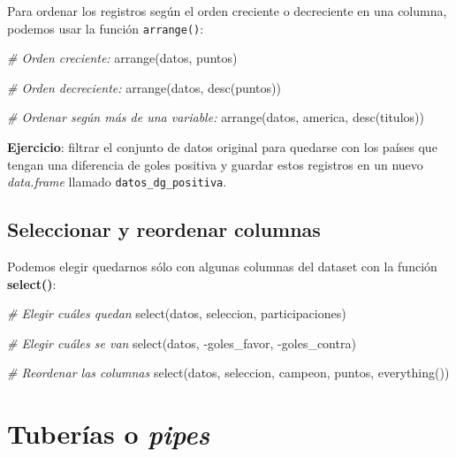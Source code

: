 \documentclass[
]{book}
\newenvironment{Shaded}{\begin{snugshade}}{\end{snugshade}}
\newcommand{\CommentTok}[1]{\textcolor[rgb]{0.56,0.35,0.01}{\textit{#1}}}
\newcommand{\FunctionTok}[1]{\textcolor[rgb]{0.00,0.00,0.00}{#1}}
\newcommand{\NormalTok}[1]{#1}
\newcommand{\SpecialCharTok}[1]{\textcolor[rgb]{0.00,0.00,0.00}{#1}}
\begin{document}
Para ordenar los registros según el orden creciente o decreciente en una columna, podemos usar la función \texttt{arrange()}:

\begin{Shaded}
\begin{Highlighting}[]
\CommentTok{\# Orden creciente:}
\FunctionTok{arrange}\NormalTok{(datos, puntos)}

\CommentTok{\# Orden decreciente:}
\FunctionTok{arrange}\NormalTok{(datos, }\FunctionTok{desc}\NormalTok{(puntos))}

\CommentTok{\# Ordenar según más de una variable:}
\FunctionTok{arrange}\NormalTok{(datos, america, }\FunctionTok{desc}\NormalTok{(titulos))}
\end{Highlighting}
\end{Shaded}

\textbf{Ejercicio}: filtrar el conjunto de datos original para quedarse con los países que tengan una diferencia de goles positiva y guardar estos registros en un nuevo \emph{data.frame} llamado \texttt{datos\_dg\_positiva}.

\hypertarget{seleccionar-y-reordenar-columnas}{%
\subsection{Seleccionar y reordenar columnas}\label{seleccionar-y-reordenar-columnas}}

Podemos elegir quedarnos sólo con algunas columnas del dataset con la función \textbf{select()}:

\begin{Shaded}
\begin{Highlighting}[]
\CommentTok{\# Elegir cuáles quedan}
\FunctionTok{select}\NormalTok{(datos, seleccion, participaciones)}

\CommentTok{\# Elegir cuáles se van}
\FunctionTok{select}\NormalTok{(datos, }\SpecialCharTok{{-}}\NormalTok{goles\_favor, }\SpecialCharTok{{-}}\NormalTok{goles\_contra)}

\CommentTok{\# Reordenar las columnas}
\FunctionTok{select}\NormalTok{(datos, seleccion, campeon, puntos, }\FunctionTok{everything}\NormalTok{())}
\end{Highlighting}
\end{Shaded}

\hypertarget{tuberuxedas-o-pipes}{%
\section{\texorpdfstring{Tuberías o \emph{pipes}}{Tuberías o pipes}}\label{tuberuxedas-o-pipes}}
\end{document}
